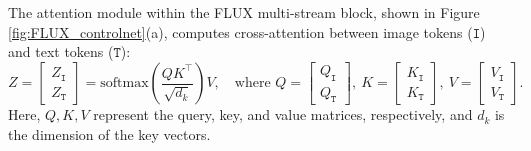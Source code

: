 \documentclass{article}
\begin{document}



The attention module within the FLUX multi-stream block, shown in Figure \ref{fig:FLUX_controlnet}(a), computes cross-attention between image tokens ($\texttt{I}$) and text tokens ($\texttt{T}$):
\begin{equation}
Z = \begin{bmatrix} Z_\texttt{I}\\Z_\texttt{T}\end{bmatrix} = \mathrm{softmax}\left(\frac{Q K^\top}{\sqrt{d_k}}\right)V,\quad \text{where }
Q = \begin{bmatrix}Q_\texttt{I}\\Q_\texttt{T}\end{bmatrix},\ 
K = \begin{bmatrix}K_\texttt{I}\\K_\texttt{T}\end{bmatrix},\ 
V = \begin{bmatrix}V_\texttt{I}\\V_\texttt{T}\end{bmatrix}.\ 
\label{eq:FLUX_attention}
\end{equation}
Here, $Q, K, V$ represent the query, key, and value matrices, respectively, and $d_k$ is the dimension of the key vectors.
\end{document}
